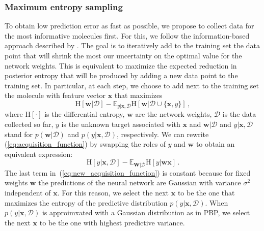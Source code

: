 \subsubsection{Maximum entropy sampling}

To obtain low prediction error as fast as possible, we propose to collect data for the most informative molecules first. For this, we follow the information-based approach described by \cite{MacKay_1992}. The goal is to iteratively add to the training set the data point that will shrink the most our uncertainty on the optimal value for the network weights. This is equivalent to maximize the expected reduction in posterior entropy that will be produced by adding a new data point to the training set. In particular, at each step, we choose to add next to the training set the molecule with feature vector $\mathbf{x}$ that maximizes
\begin{equation}
\text{H}[\mathbf{w}|\mathcal{D}]  - 
\mathbb{E}_{y|\mathbf{x},\mathcal{D}}\text{H}[\mathbf{w}|\mathcal{D}\cup\{\mathbf{x},y\}]\,,\label{eq:acquisition_function}
\end{equation}
where $\text{H}[\cdot]$ is the differential entropy, $\mathbf{w}$ are the network weights, $\mathcal{D}$ is the data collected so far, $y$ is the unknown target associated with $\mathbf{x}$ and $\mathbf{w}|\mathcal{D}$ and $y|\mathbf{x},\mathcal{D}$ stand for $p(\mathbf{w}|\mathcal{D})$ and $p(y|\mathbf{x},\mathcal{D})$, respectively. We can rewrite (\ref{eq:acquisition_function}) by swapping the roles of $y$ and $\mathbf{w}$ \cite{houlsby2012collaborative} to obtain an equivalent expression:
\begin{equation}
\text{H}[y | \mathbf{x},\mathcal{D}] - 
\mathbb{E}_{\mathbf{W} | \mathcal{D}}\text{H}[y | \mathbf{w}\mathbf{x}]\,.\label{eq:new_acquisition_function}
\end{equation}
The last term in~(\ref{eq:new_acquisition_function}) is constant because for fixed weights $\mathbf{w}$ the predictions of the neural network are Gaussian with variance $\sigma^2$ independent of $\mathbf{x}$. For this reason, we select the next $\mathbf{x}$ to be the one that maximizes the entropy of the predictive distribution $p(y| \mathbf{x},\mathcal{D})$. When $p(y| \mathbf{x},\mathcal{D})$ is approimxated with a Gaussian distribution as in PBP, we select the next $\mathbf{x}$ to be the one with highest predictive variance.